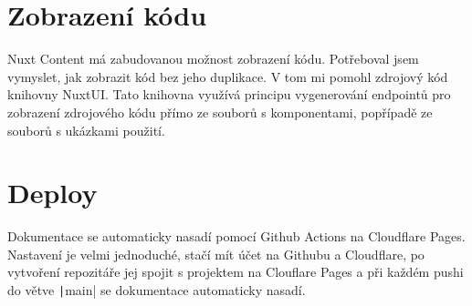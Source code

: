 \section{Zobrazení kódu}

Nuxt Content má zabudovanou možnost zobrazení kódu. \cite{NuxtContentCodeHighlighting} Potřeboval jsem vymyslet, jak zobrazit kód bez jeho duplikace.
V tom mi pomohl zdrojový kód knihovny NuxtUI. Tato knihovna využívá principu vygenerování endpointů pro zobrazení zdrojového kódu
přímo ze souborů s komponentami, popřípadě ze souborů s ukázkami použití. \cite{NuxtUISourceCodeModule}

\section{Deploy}
Dokumentace se automaticky nasadí pomocí Github Actions na Cloudflare Pages. Nastavení je velmi jednoduché, stačí mít účet na Githubu a Cloudflare,
po vytvoření repozitáře jej spojit s projektem na Clouflare Pages a při každém pushi do větve \texttt|main| se dokumentace automaticky nasadí.




